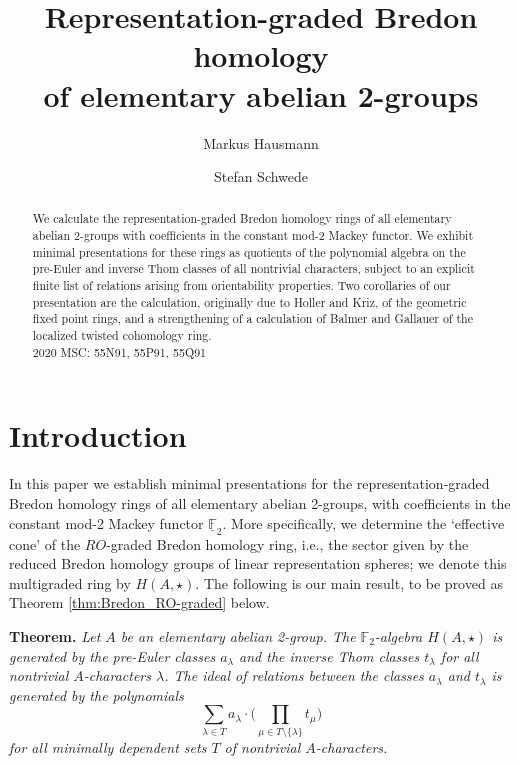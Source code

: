 \documentclass{amsart}[12pt]
\newcommand{\mF}{{\mathbb F}}
\numberwithin{equation}{section}
\theoremstyle{definition}
\begin{document}
 

\title[Representation-graded Bredon homology of elementary abelian 2-groups]
{Representation-graded Bredon homology\\of elementary abelian 2-groups}
\author{Markus Hausmann}
\author{Stefan Schwede}
\address{Mathematisches Institut, Universit{\"a}t Bonn, Germany}



\begin{abstract}
  We calculate the representation-graded Bredon homology rings
  of all elementary abelian 2-groups with coefficients in the constant mod-2 Mackey functor.
  We exhibit minimal presentations for these rings
  as quotients of the polynomial algebra on the pre-Euler and inverse Thom classes
  of all nontrivial characters,
  subject to an explicit finite list of relations arising from orientability properties.
  Two corollaries of our presentation are the calculation,
  originally due to Holler and Kriz, of the geometric fixed point rings,
  and a strengthening of a calculation of Balmer and Gallauer
  of the localized twisted cohomology ring.\medskip\\
  2020 MSC: 55N91, 55P91, 55Q91 
\end{abstract}

\maketitle


\section*{Introduction}

In this paper we establish minimal presentations for the representation-graded Bredon homology
rings of all elementary abelian 2-groups,
with coefficients in the constant mod-2 Mackey functor $\underline\mF_2$.
More specifically, we determine the `effective cone' of the $R O$-graded Bredon homology ring,
i.e., the sector given by the reduced Bredon homology groups
of linear representation spheres; we denote this multigraded ring by $H(A,\star)$.
The following is our main result,
to be proved as Theorem \ref{thm:Bredon_RO-graded} below.\smallskip

{\bf Theorem.} {\em
  Let $A$ be an elementary abelian 2-group.
  The $\mF_2$-algebra $H(A,\star)$ is generated
    by the pre-Euler classes $a_\lambda$ and the inverse Thom classes $t_\lambda$
    for all nontrivial $A$-characters $\lambda$.
    The ideal of relations between the classes $a_\lambda$ and $t_\lambda$
    is generated by the polynomials
    \[ \sum_{\lambda\in T}  a_\lambda \cdot \bigg( \prod_{\mu\in T\setminus\{\lambda\}} t_\mu\bigg) \]
    for all minimally dependent sets $T$ of nontrivial $A$-characters.
}\smallskip
\end{document}
